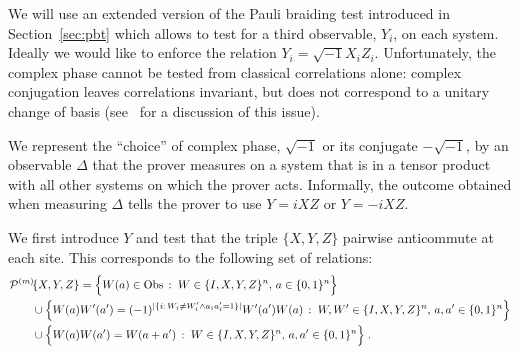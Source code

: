 We will use an extended version of the Pauli braiding test introduced in Section~\ref{sec:pbt} which allows to test for a third observable, $Y_i$, on each system. Ideally we would like to enforce the relation $Y_i=\sqrt{-1}X_iZ_i$. Unfortunately, the complex phase cannot be tested from classical correlations alone: complex conjugation leaves correlations invariant, but does not correspond to a unitary change of basis  (see~\cite[Appendix A]{reichardt2012classicalarxiv} for a discussion of this issue). 

We represent the ``choice'' of complex phase, $\sqrt{-1}$ or its conjugate $-\sqrt{-1}$, by an observable $\Delta$ that the prover measures on a system that is in a tensor product with all other systems on which the prover acts. Informally, the outcome obtained when measuring $\Delta$ tells the prover to use $Y = i XZ$ or $Y=-iXZ$. 

We first introduce $Y$ and test that the triple $\{X,Y,Z\}$ pairwise anticommute at each site. This corresponds to the following set of relations: 
\begin{align*}
& {\mathcal{P}^{(m)}\!}\{X,Y,Z\} = \Big\{ W(a)\in\mathrm{Obs}\,:\;W \in \{I,X,Y,Z\}^n,\,a\in\{0,1\}^n\Big\} \\
&\qquad\cup \Big\{W(a)W'(a')=(-1)^{|\{i:\,W_i\neq W'_i \wedge a_ia'_i=1\}|} W'(a')W(a)\,:\;W,W' \in \{I,X,Y,Z\}^n,\,a,a'\in\{0,1\}^n\Big\}\\
&\qquad \cup\Big\{ W(a)W(a')=W(a+a')\,:\;W \in \{I,X,Y,Z\}^n,\,a,a'\in\{0,1\}^n\Big\}\;.
\end{align*}



